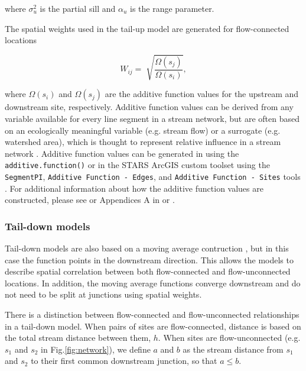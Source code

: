 \noindent where $\sigma^2_{u}$ is the partial sill and $\alpha_u$ is the range parameter.

The spatial weights used in the tail-up model are generated for flow-connected locations 

$$W_{ij}=\sqrt[]{\frac{\Omega(s_j)}{\Omega(s_i)}},$$

\noindent where $\Omega(s_i)$ and $\Omega(s_j)$ are the additive function values for the upstream and downstream site, respectively. Additive function values can be derived from any variable available for every line segment in a stream network, but are often based on an ecologically meaningful variable (e.g. stream flow) or a surrogate (e.g. watershed area), which is thought to represent relative influence in a stream network \citep{frieden2014improving}. Additive function values can be generated in  using the \texttt{additive.function()} or in the STARS ArcGIS custom toolset using the \texttt{SegmentPI}, \texttt{Additive Function - Edges}, and \texttt{Additive Function - Sites} tools \citep{peterson2014stars}. For additional information about how the additive function values are constructed, please see \citet{ver2006spatial} or Appendices A in \citet{santos2022bayesian} or \citet{peterson2010mixed}. 

\subsubsection{Tail-down models}
Tail-down models are also based on a moving average contruction \citep{ver2010moving}, but in this case the function points in the downstream direction. This allows the models to describe spatial correlation between both flow-connected and flow-unconnected locations. In addition, the moving average functions converge downstream and do not need to be split at junctions using spatial weights. 

There is a distinction between flow-connected and flow-unconnected relationships in a tail-down model. When pairs of sites are flow-connected, distance is based on the total stream distance between them, $h$. When sites are flow-unconnected (e.g. $s_1$ and $s_2$ in Fig.\ref{fig:network}), we define $a$ and $b$ as the stream distance from $s_1$ and $s_2$ to their first common downstream junction,  so that $a \leqslant b$. 

